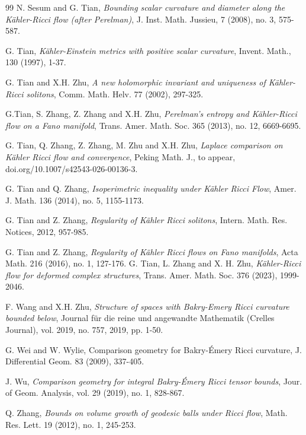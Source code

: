 \documentclass[11pt]{amsart}
\numberwithin{equation}{section}
\begin{document}
\begin{thebibliography}{99}
  N. Sesum  and  G. Tian,  \textit{Bounding scalar curvature and diameter along the K\"{a}hler-Ricci flow (after Perelman)}, J. Inst. Math. Jussieu, 7 (2008), no. 3,  575-587.

 G. Tian, {\it  K\"ahler-Einstein metrics with positive scalar curvature}, Invent. Math., 130 (1997), 1-37.



    G. Tian and  X.H. Zhu,  {\it A new holomorphic invariant and uniqueness of K\"ahler-Ricci
 solitons}, Comm. Math. Helv.  77  (2002), 297-325.

    G.Tian, S.  Zhang,  Z. Zhang  and  X.H. Zhu, {\it Perelman's entropy and K\"ahler-Ricci flow on a Fano manifold}, Trans. Amer. Math. Soc.  365  (2013), no. 12, 6669-6695.

 G. Tian,  Q. Zhang, Z. Zhang, M. Zhu and X.H. Zhu,  {\it Laplace comparison on K\"ahler Ricci flow and convergence},  Peking Math. J., to appear, doi.org/10.1007/s42543-026-00136-3.

 G. Tian and Q. Zhang, {\it Isoperimetric inequality under K\"ahler Ricci Flow}, Amer. J. Math. 136 (2014), no. 5, 1155-1173.


 G. Tian  and Z. Zhang,
{\it Regularity of  K\"ahler Ricci solitons},  Intern.  Math.  Res.  Notices,  2012, 957-985.


 G. Tian and Z.  Zhang,
{\it Regularity of  K\"ahler Ricci flows on Fano manifolds}, Acta Math. 216 (2016), no. 1, 127-176.
  G. Tian,   L. Zhang  and  X. H. Zhu,  {\it K\"ahler-Ricci  flow for deformed  complex structures}, Trans. Amer. Math. Soc. 376 (2023), 1999-2046.

 F. Wang and X.H.  Zhu,  {\it Structure of spaces with Bakry-Emery Ricci curvature bounded below},   Journal f\"ur die reine und angewandte Mathematik (Crelles Journal), vol. 2019, no. 757, 2019, pp. 1-50.

  G. Wei  and  W. Wylie,  Comparison geometry for Bakry-\'Emery Ricci curvature,  J. Differential Geom. 83 (2009), 337-405.

 J. Wu,  {\it  Comparison geometry for integral  Bakry-\'Emery Ricci tensor bounds}, Jour. of Geom. Analysis, vol. 29 (2019), no. 1, 828-867.

 Q. Zhang, {\it Bounds on volume growth of geodesic balls under Ricci flow},
Math. Res. Lett. 19 (2012), no. 1, 245-253.

\end{thebibliography}
\end{document}
